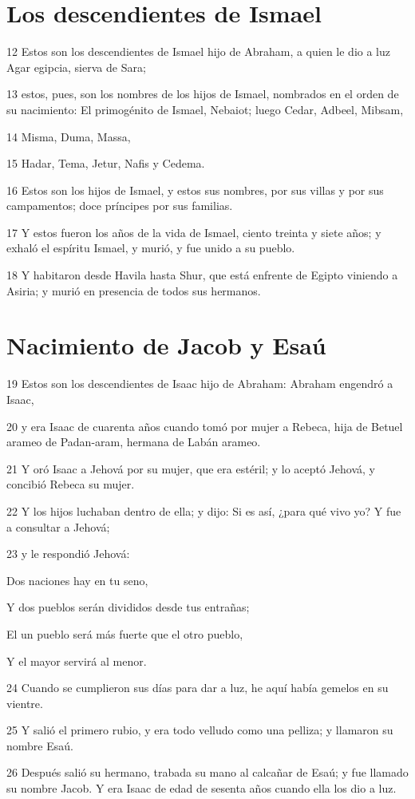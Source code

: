 \section*{Los descendientes de Ismael}

\par 12 Estos son los descendientes de Ismael hijo de Abraham, a quien le dio a luz Agar egipcia, sierva de Sara;
\par 13 estos, pues, son los nombres de los hijos de Ismael, nombrados en el orden de su nacimiento: El primogénito de Ismael, Nebaiot; luego Cedar, Adbeel, Mibsam,
\par 14 Misma, Duma, Massa,
\par 15 Hadar, Tema, Jetur, Nafis y Cedema.
\par 16 Estos son los hijos de Ismael, y estos sus nombres, por sus villas y por sus campamentos; doce príncipes por sus familias.
\par 17 Y estos fueron los años de la vida de Ismael, ciento treinta y siete años; y exhaló el espíritu Ismael, y murió, y fue unido a su pueblo.
\par 18 Y habitaron desde Havila hasta Shur, que está enfrente de Egipto viniendo a Asiria; y murió en presencia de todos sus hermanos.

\section*{Nacimiento de Jacob y Esaú}

\par 19 Estos son los descendientes de Isaac hijo de Abraham: Abraham engendró a Isaac,
\par 20 y era Isaac de cuarenta años cuando tomó por mujer a Rebeca, hija de Betuel arameo de Padan-aram, hermana de Labán arameo.
\par 21 Y oró Isaac a Jehová por su mujer, que era estéril; y lo aceptó Jehová, y concibió Rebeca su mujer.
\par 22 Y los hijos luchaban dentro de ella; y dijo: Si es así, ¿para qué vivo yo? Y fue a consultar a Jehová;
\par 23 y le respondió Jehová:
\par Dos naciones hay en tu seno,
\par Y dos pueblos serán divididos desde tus entrañas;
\par El un pueblo será más fuerte que el otro pueblo,
\par Y el mayor servirá al menor.
\par 24 Cuando se cumplieron sus días para dar a luz, he aquí había gemelos en su vientre.
\par 25 Y salió el primero rubio, y era todo velludo como una pelliza; y llamaron su nombre Esaú.
\par 26 Después salió su hermano, trabada su mano al calcañar de Esaú; y fue llamado su nombre Jacob. Y era Isaac de edad de sesenta años cuando ella los dio a luz.

